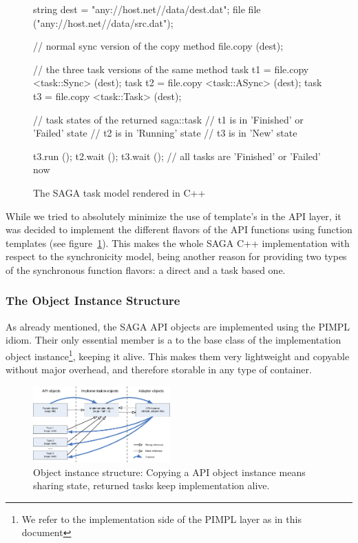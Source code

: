 \begin{figure}[!ht]
 \begin{center}
  \begin{mycode}[label=SAGA task model]
    string dest = "any://host.net//data/dest.dat";
    file   file  ("any://host.net//data/src.dat");

    // normal sync version of the copy method
    file.copy (dest);

    // the three task versions of the same method
    task t1 = file.copy <task::Sync>  (dest);
    task t2 = file.copy <task::ASync> (dest);
    task t3 = file.copy <task::Task>  (dest);

    // task states of the returned saga::task
    // t1 is in 'Finished' or 'Failed' state
    // t2 is in 'Running'              state
    // t3 is in 'New'                  state

    t3.run  ();
    t2.wait ();
    t3.wait ();
    // all tasks are 'Finished' or 'Failed' now
  \end{mycode}
  \up
  \up
  \caption{\label{src:tasks}
    The SAGA task model rendered in C++}
 \end{center}
\end{figure}

While we tried to absolutely minimize the use of template's in the 
API layer, it was decided to implement the different flavors of the API 
functions using function templates (see figure~\ref{src:tasks}). 
This makes the whole SAGA C++ implementation  with respect to 
the synchronicity model, being another reason for providing 
two types of the synchronous function flavors: a direct and a task 
based one.

\subsubsection{The Object Instance Structure}
\label{ssec:pimpl}

As already mentioned, the SAGA API objects are implemented using the PIMPL idiom.
Their only essential member is a  to the 
base class of the implementation object instance\footnote{\small We refer to the 
implementation side of the PIMPL layer as  in this document}, 
keeping it alive. This makes them very 
lightweight and copyable without major overhead, and therefore storable in any 
type of container.

\begin{figure}[!ht]
 \begin{center}
  \includegraphics[width=0.47\textwidth]{images/object_structure}
  \up
  \caption{\label{fig:object_structure}
    Object instance structure: Copying a API object instance means sharing 
    state, returned tasks keep implementation alive.}
 \end{center}
\end{figure}

